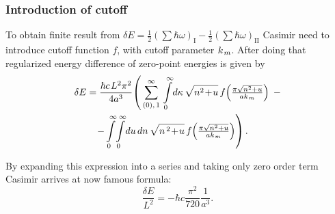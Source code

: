 \documentclass[10pt,t]{beamer}
\begin{document}
\begin{frame}
  \frametitle{Introduction of cutoff}


  To obtain finite result from
  $\delta E = \frac{ 1 }{ 2 } ( \sum \hbar \omega )_{ \text{I} } -
  \frac{ 1 }{ 2 } ( \sum \hbar \omega )_{ \text{II} }$ Casimir need to introduce
  cutoff function $f$, with cutoff parameter $k_{ \hspace{0.09em} m }$.
  After doing that regularized energy difference of zero-point energies is
  given by
  \begin{equation}
    \label{eq:Oryginalna-praca-ETC-05}
    \begin{split}
      \delta E
      &=
        \frac{ \hbar c \HorSpaceFive L^{ 2 } \pi^{ 2 } }{ 4 a^{ 3 } } \!
        \left( \, \sum_{ ( 0 ), \, 1 }^{ \infty } \,
        \int\limits_{ 0 }^{ \infty } \! d\kappa \, \sqrt{ n^{ 2 } \! + \! u } \,
        f\!\left( \tfrac{ \pi \sqrt{ n^{ 2 } + u } }{ a k_{ \HorSpaceTwo m } }
        \right) \right. \, - \\
      &\left. \;\;\;
        - \int\limits_{ 0 }^{ \infty } \! \int\limits_{ 0 }^{ \infty } \! du \, dn \,
        \sqrt{ n^{ \, 2 } \! + \! u } \,
        f\!\left( \tfrac{ \pi \sqrt{ n^{ 2 } + u } }{
        a k_{ \HorSpaceTwo m } } \right) \right).
    \end{split}
  \end{equation}

  By expanding this expression into a series and taking only zero order term
  Casimir arrives at now famous formula:
  \begin{equation}
    \label{eq:Oryginalna-praca-ETC-06}
    \frac{ \delta E }{ L^{ 2 } } =
    -\hbar c \frac{ \pi^{ 2 } }{ 720 } \frac{ 1 }{ a^{ 3 } }.
  \end{equation}

\end{frame}
\end{document}
